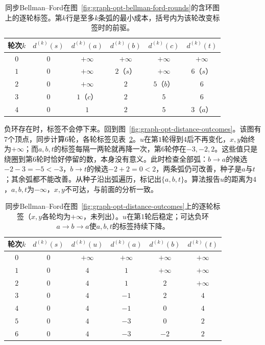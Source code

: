 \begin{table}[!htb]
  \centering
  \caption{同步Bellman--Ford在图~\ref{fig:graph-opt-bellman-ford-rounds}的含环图上的逐轮标签。第$k$行是至多$k$条弧的最小成本，括号内为该轮改变标签时的前驱。}
  \label{tab:graph-opt-bellman-ford-rounds}
  \begin{tabular}{cccccc}
    \toprule
    轮次$k$ & $d^{(k)}(s)$ & $d^{(k)}(a)$ & $d^{(k)}(b)$ & $d^{(k)}(c)$ & $d^{(k)}(t)$ \\
    \midrule
    $0$ & $0$ & $+\infty$ & $+\infty$ & $+\infty$ & $+\infty$ \\
    $1$ & $0$ & $+\infty$ & $2$（$s$） & $+\infty$ & $6$（$s$） \\
    $2$ & $0$ & $+\infty$ & $2$ & $5$（$b$） & $6$ \\
    $3$ & $0$ & $1$（$c$） & $2$ & $5$ & $6$ \\
    $4$ & $0$ & $1$ & $2$ & $5$ & $3$（$a$） \\
    \bottomrule
  \end{tabular}
\end{table}

负环存在时，标签不会停下来。回到图~\ref{fig:graph-opt-distance-outcomes}。该图有$7$个顶点，同步计算$6$轮，各轮标签见表~\ref{tab:graph-opt-bellman-ford-negative}。$u$在第$1$轮得到$4$后不再变化，$x,y$始终为$+\infty$；而$a,b,t$的标签每隔一两轮就再降一次，第$6$轮停在$-3,-2,2$。这些值只是绕圈到第$6$轮时恰好停留的数，本身没有意义。此时检查全部弧：$b\to a$的候选$-2-3=-5<-3$，$b\to t$的候选$-2+2=0<2$，两条弧仍可改善，种子是$a$与$t$；其余弧都不能改善。从种子沿出弧遍历，标记出$\{a,b,t\}$。算法报告$u$的距离为$4$，$a,b,t$为$-\infty$，$x,y$不可达，与前面的分析一致。

\begin{table}[!htb]
  \centering
  \caption{同步Bellman--Ford在图~\ref{fig:graph-opt-distance-outcomes}上的逐轮标签（$x,y$各轮均为$+\infty$，未列出）。$u$在第$1$轮后稳定；可达负环$a\to b\to a$使$a,b,t$的标签持续下降。}
  \label{tab:graph-opt-bellman-ford-negative}
  \begin{tabular}{cccccc}
    \toprule
    轮次$k$ & $d^{(k)}(s)$ & $d^{(k)}(u)$ & $d^{(k)}(a)$ & $d^{(k)}(b)$ & $d^{(k)}(t)$ \\
    \midrule
    $0$ & $0$ & $+\infty$ & $+\infty$ & $+\infty$ & $+\infty$ \\
    $1$ & $0$ & $4$ & $1$ & $+\infty$ & $+\infty$ \\
    $2$ & $0$ & $4$ & $1$ & $2$ & $+\infty$ \\
    $3$ & $0$ & $4$ & $-1$ & $2$ & $4$ \\
    $4$ & $0$ & $4$ & $-1$ & $0$ & $4$ \\
    $5$ & $0$ & $4$ & $-3$ & $0$ & $2$ \\
    $6$ & $0$ & $4$ & $-3$ & $-2$ & $2$ \\
    \bottomrule
  \end{tabular}
\end{table}

